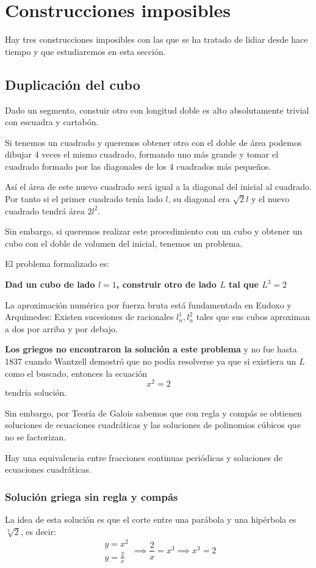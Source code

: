 \documentclass{apuntes}
\begin{document}
\section{Construcciones imposibles}
Hay tres construcciones imposibles con las que se ha tratado de lidiar desde hace tiempo y que estudiaremos en esta sección.

\subsection{Duplicación del cubo}

Dado un segmento, constuir otro con longitud doble es alto absolutamente trivial con escuadra y cartabón.

Si tenemos un cuadrado y queremos obtener otro con el doble de área podemos dibujar 4 veces el mismo cuadrado, formando uno más grande y tomar el cuadrado formado por las diagonales de los 4 cuadrados más pequeños.

Así el área de este nuevo cuadrado será igual a la diagonal del inicial al cuadrado. Por tanto si el primer cuadrado tenía lado $l$, su diagonal era $\sqrt{2}l$ y el nuevo cuadrado tendrá área $2l^2$.

Sin embargo, si queremos realizar este procedimiento con un cubo y obtener un cubo con el doble de volumen del inicial, tenemos un problema.

El problema formalizado es:

\textbf{Dad un cubo de lado $l=1$, construir otro de lado $L$ tal que $L^3=2$}

La aproximación numérica por fuerza bruta está fundamentada en Eudoxo y Arquímedes: Existen sucesiones de racionales $l_n^1,l_n^2$ tales que sus cubos aproximan a dos por arriba y por debajo.

\textbf{Los griegos no encontraron la solución a este problema} y no fue hasta 1837 cuando Wantzell demostró que no podía resolverse ya que si existiera un $L$ como el buscado, entonces la ecuación
\[x^2=2\]
tendría solución.

Sin embargo, por Teoría de Galois sabemos que con regla y compás se obtienen soluciones de ecuaciones cuadráticas y las soluciones de polinomios cúbicos que no se factorizan.

\obs Hay una equivalencia entre fracciones continuas periódicas y soluciones de ecuaciones cuadráticas.

\subsubsection{Solución griega sin regla y compás}
La idea de esta solución es que el corte entre una parábola y una hipérbola es $\sqrt[3]{2}$, es decir:
\[\begin{array}{l}y=x^2 \\ y=\frac{2}{x}\end{array} \implies \frac{2}{x} = x^3 \implies x^3 = 2\]
\end{document}
